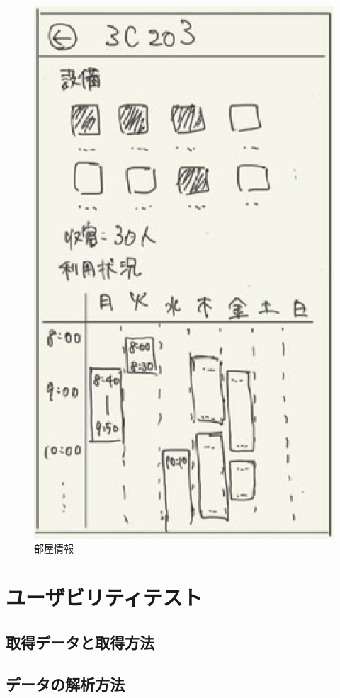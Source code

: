 \documentclass[12pt,a4paper,dvipdf]{jsarticle}
\begin{document}
\begin{figure}[H]
\begin{minipage}[b]{0.24\columnwidth}
        \includegraphics[width=0.9\columnwidth]{./img/部屋情報.png}
        \caption{部屋情報}
    \end{minipage}
\end{figure}



\newpage
\section{ユーザビリティテスト}
\subsection{取得データと取得方法}
\subsection{データの解析方法}
\end{document}
